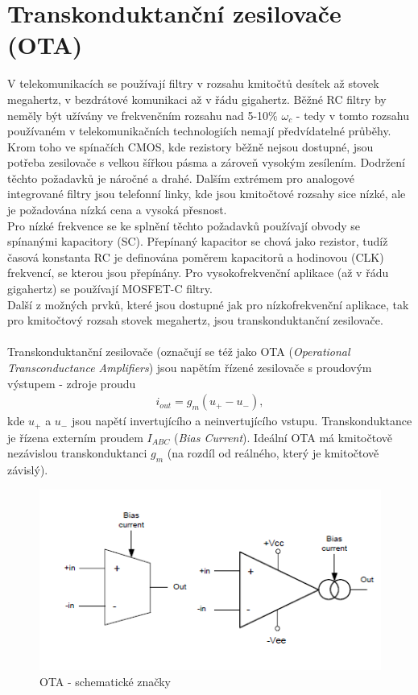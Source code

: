 \documentclass[twoside]{article}
\begin{document}
\section{Transkonduktanční zesilovače (OTA)}
V telekomunikacích se používají filtry v rozsahu kmitočtů desítek až stovek megahertz, v bezdrátové komunikaci až v řádu gigahertz. Běžné RC filtry by neměly být užívány ve frekvenčním rozsahu nad 5-10$\%$ $\omega _c$ - tedy v tomto rozsahu používaném v telekomunikačních technologiích nemají předvídatelné průběhy. Krom toho ve spínačích CMOS, kde rezistory běžně nejsou dostupné, jsou potřeba zesilovače s velkou šířkou pásma a zároveň vysokým zesílením. Dodržení těchto požadavků je náročné a drahé. Dalším extrémem pro analogové integrované filtry jsou telefonní linky, kde jsou kmitočtové rozsahy sice nízké, ale je požadována nízká cena a vysoká přesnost.\\
Pro nízké frekvence se ke splnění těchto požadavků používají obvody se spínanými kapacitory (SC). Přepínaný kapacitor se chová jako rezistor, tudíž časová konstanta RC je definována poměrem kapacitorů a hodinovou (CLK) frekvencí, se kterou jsou přepínány. Pro vysokofrekvenční aplikace (až v řádu gigahertz) se používají MOSFET-C filtry.\\
Další z možných prvků, které jsou dostupné jak pro nízkofrekvenční aplikace, tak pro kmitočtový rozsah stovek megahertz, jsou transkonduktanční zesilovače.\\\\
Transkonduktanční zesilovače (označují se též jako OTA (\textit{Operational Transconductance Amplifiers}) jsou napětím řízené zesilovače s proudovým výstupem - zdroje proudu
\begin{align}
i_{out} = g_m(u_+ - u_-),
\end{align}
kde $u_+$ a $u_-$ jsou napětí invertujícího a neinvertujícího vstupu.  Transkonduktance je řízena externím proudem $I_{ABC}$ (\textit{Bias Current}). Ideální OTA má kmitočtově nezávislou transkonduktanci $g_m$ (na rozdíl od reálného, který je kmitočtově závislý).
\begin{figure}[H]
\centering
\includegraphics[scale=0.7]{image7.png}
\caption{OTA - schematické značky \cite{3}}
\end{figure}
\end{document}
